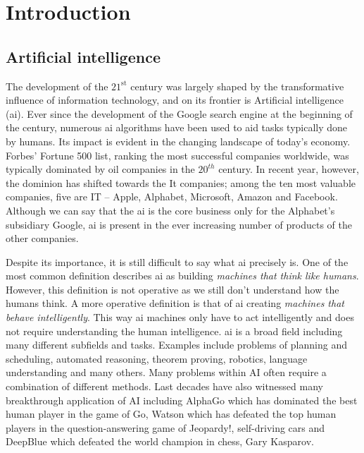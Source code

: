 \chapter{Introduction}\label{ch:introduction}


\section{Artificial intelligence}


The development of the $21^{\text{st}}$ century was largely shaped by the transformative influence of information technology, and on its frontier is  Artificial intelligence (\gls{ai}).
Ever since the development of the Google search engine at the beginning of the century, numerous \gls{ai} algorithms have been used to aid tasks typically done by humans.
Its impact is evident in the changing landscape of today's economy.
Forbes' Fortune 500 list, ranking the most successful companies worldwide, was typically dominated by oil companies in the $20^{th}$ century.
In recent year, however, the dominion has shifted towards the It companies; among the ten most valuable companies, five are IT -- Apple, Alphabet, Microsoft, Amazon and Facebook.
Although we can say that the \gls{ai} is the core business only for the Alphabet's subsidiary Google, \gls{ai} is present in the ever increasing number of products of the other companies.







Despite its importance, it is still difficult to say what \gls{ai} precisely is. 
One of the most common definition describes \gls{ai} as building \textit{machines that think like humans}.
However, this definition is not operative as we still don't understand how the humans think.
A more operative definition is that of \gls{ai} creating \textit{machines that behave intelligently}.
This  way \gls{ai} machines only have to act intelligently and does not require understanding the human intelligence.
\gls{ai} is a broad field including many different subfields and tasks.
Examples include problems of planning and scheduling, automated reasoning, theorem proving, robotics, language understanding and many others.
Many problems within AI often require a combination of different methods.
Last decades have also witnessed many breakthrough application of AI including AlphaGo \cite{SilverHuangEtAl16nature,silver2017mastering} which has dominated the best human player in the game of Go, Watson \cite{journals/aim/FerrucciBCFGKLMNPSW10} which has defeated the top human players in the question-answering game of Jeopardy!, self-driving cars and DeepBlue \cite{Hsu:2002:BDB:601291}  which defeated the world champion in chess, Gary Kasparov.





